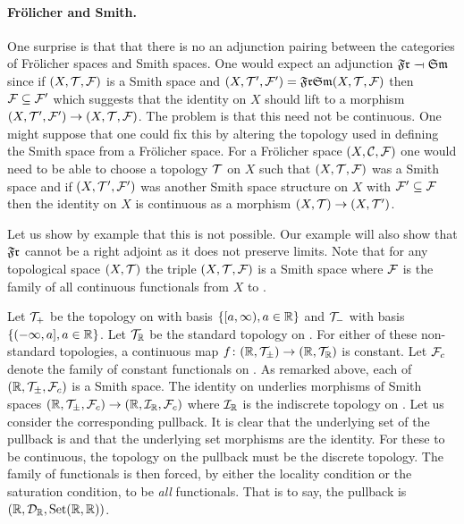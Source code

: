 \documentclass[%
12pt,%
arxiv,%
defaults
]{myclass}
\begin{document}
\paragraph{Fr\"olicher and Smith.}
One surprise is that that there is no an adjunction pairing between the categories of Fr\"olicher spaces and Smith spaces.
One would expect an adjunction \(\SmFr \adjoint \FrSm\) since if \((X, \mathcal{T}, \mathcal{F})\) is a Smith space and
 \((X, \m{T}', \m{F}') = \SmFr\FrSm(X,\m{T},\m{F})\) then \(\mathcal{F} \subseteq \mathcal{F}'\) which suggests that the identity on \(X\) should lift to a morphism
 \((X, \mathcal{T}', \mathcal{F}') \to (X, \mathcal{T}, \mathcal{F})\).
The problem is that this need not be continuous.
One might suppose that one could fix this by altering the topology used in defining the Smith space from a Fr\"olicher space.
For a Fr\"olicher space \((X, \mathcal{C}, \mathcal{F})\) one would need to be able to choose a topology \(\mathcal{T}\) on \(X\) such that \((X, \mathcal{T}, \mathcal{F})\) was a Smith space and if \((X, \mathcal{T}', \mathcal{F}')\) was another Smith space structure on \(X\) with
 \(\mathcal{F}' \subseteq \mathcal{F}\)
then the identity on \(X\) is continuous as a morphism
 \((X, \mathcal{T}) \to (X, \mathcal{T}')\).

\medskip

Let us show by example that this is not possible.
Our example will also show that \(\SmFr\) cannot be a right adjoint as it does not preserve limits.
Note that for any topological space \((X, \mathcal{T})\) the triple \((X, \mathcal{T}, \mathcal{F})\) is a Smith space where \(\mathcal{F}\) is the family of all continuous functionals from \(X\) to \R.

Let \(\mathcal{T}_+\) be the topology on \R with basis
 \(\{[a, \infty), a \in \mathbb{R}\}\)
and \(\mathcal{T}_-\) with basis
 \(\{(-\infty, a], a \in \mathbb{R}\}\).
Let \(\mathcal{T}_{\mathbb{R}}\) be the standard topology on \R.
For either of these non\hyp{}standard topologies, a continuous map
 \(f \colon (\mathbb{R}, \mathcal{T}_\pm) \to (\mathbb{R}, \mathcal{T}_{\mathbb{R}})\)
is constant.
Let \(\mathcal{F}_c\) denote the family of constant functionals on \R.
As remarked above, each of
 \((\mathbb{R}, \mathcal{T}_\pm, \mathcal{F}_c)\)
is a Smith space.
The identity on \R underlies morphisms of Smith spaces
 \((\mathbb{R}, \mathcal{T}_\pm, \mathcal{F}_c) \to (\mathbb{R}, \mathcal{I}_{\mathbb{R}}, \mathcal{F}_c)\)
where \(\mathcal{I}_{\mathbb{R}}\) is the indiscrete topology on \R.
Let us consider the corresponding pullback.
It is clear that the underlying set of the pullback is \R and that the underlying set morphisms are the identity.
For these to be continuous, the topology on the pullback must be the discrete topology.
The family of functionals is then forced, by either the locality condition or the saturation condition, to be \emph{all} functionals.
That is to say, the pullback is
 \((\mathbb{R}, \mathcal{D}_{\mathbb{R}}, \operatorname{Set}(\mathbb{R},\mathbb{R}))\).
\end{document}
